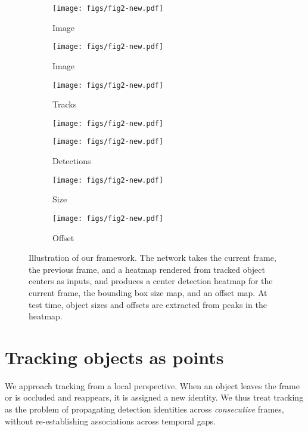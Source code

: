 \documentclass[runningheads]{llncs}
\newcommand{\lblfig}[1]{\label{fig:#1}}
\begin{document}
\begin{figure}[t]
\captionsetup{type=figure}
  \begin{subfigure}[t]{0.14\linewidth}
   \texttt{[image: figs/fig2-new.pdf]}
   \caption*{\scriptsize Image }
  \end{subfigure}\begin{subfigure}[t]{0.14\linewidth}
   \centering
   \texttt{[image: figs/fig2-new.pdf]}
   \caption*{\scriptsize Image }
  \end{subfigure}\begin{subfigure}[t]{0.14\linewidth}
   \centering
   \texttt{[image: figs/fig2-new.pdf]}
   \caption*{\scriptsize Tracks }
  \end{subfigure}
  \begin{subfigure}[t]{0.14\linewidth}
   \centering
   \texttt{[image: figs/fig2-new.pdf]}
   \caption*{}
  \end{subfigure}\begin{subfigure}[t]{0.14\linewidth}
   \centering
   \texttt{[image: figs/fig2-new.pdf]}
   \caption*{\scriptsize Detections }
  \end{subfigure}\begin{subfigure}[t]{0.14\linewidth}
   \centering
   \texttt{[image: figs/fig2-new.pdf]}
   \caption*{\scriptsize Size }
  \end{subfigure}
  \begin{subfigure}[t]{0.14\linewidth}
   \centering
   \texttt{[image: figs/fig2-new.pdf]}
   \caption*{\scriptsize Offset }
  \end{subfigure}\caption{Illustration of our framework. The network takes the current frame, the previous frame, and a heatmap rendered from tracked object centers as inputs, and produces a center detection heatmap for the current frame, the bounding box size map, and an offset map. At test time, object sizes and offsets are extracted from peaks in the heatmap.}
\lblfig{framework}
\end{figure}

\section{Tracking objects as points}
We approach tracking from a local perspective. 
When an object leaves the frame or is occluded and reappears, it is assigned a new identity.
We thus treat tracking as the problem of propagating detection identities across \emph{consecutive} frames, without re-establishing associations across temporal gaps.
\end{document}
